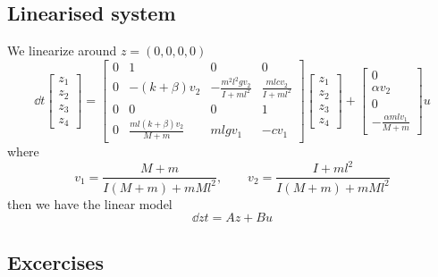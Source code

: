 \documentclass[12pt]{article}
\begin{document}
\subsection{Linearised system} 
We linearize around $z=(0,0,0,0)$
\[
\dd{}{t} \begin{bmatrix}
z_1 \\ z_2 \\ z_3 \\ z_4 \end{bmatrix} = \begin{bmatrix}
0 & 1 & 0 & 0 \\
0 & - (k+\beta) v_2 & - \frac{m^2 l^2 g v_2}{I + ml^2} & \frac{ml c v_2}{I + ml^2} \\
0 & 0 & 0 & 1 \\
0 & \frac{ml(k+\beta)v_2}{M+m} & mlgv_1 & - c  v_1
\end{bmatrix} \begin{bmatrix}
z_1 \\ z_2 \\ z_3 \\ z_4 \end{bmatrix} +
\begin{bmatrix}
0 \\ \alpha v_2 \\ 0 \\ -\frac{\alpha mlv_1}{M+m} \end{bmatrix} u
\]
where
\[
v_1 = \frac{M + m}{I(M+m) + mMl^2}, \qquad v_2 = \frac{I + ml^2}{I(M+m) + mMl^2}
\]
then we have the linear model
\[
\dd{z}{t} = Az + Bu
\]
\subsection{Excercises}
\end{document}
